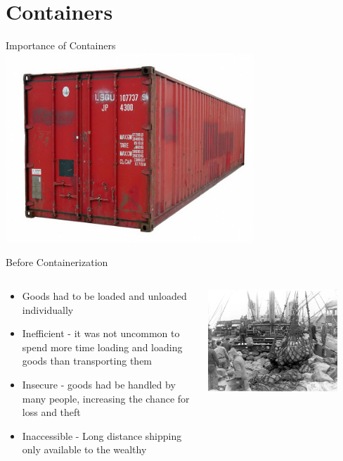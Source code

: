 \section{Containers}

\begin{frame}{Importance of Containers}
\centering
\includegraphics[width=0.7\textwidth]{images/shipping_container}
\end{frame}

\begin{frame}{Before Containerization}
\begin{columns}[c]
\begin{column}{0.5\textwidth}
\begin{itemize}
\item Goods had to be loaded and unloaded individually
\item Inefficient - it was not uncommon to spend more time loading and loading goods than transporting them
\item Insecure - goods had be handled by many people, increasing the chance for loss and theft
\item Inaccessible - Long distance shipping only available to the wealthy 
\end{itemize}
\end{column}
\begin{column}{0.5\textwidth}
\centering
\includegraphics[width=0.85\textwidth]{images/old_ship_unloading}
\end{column}
\end{columns}
\end{frame}

